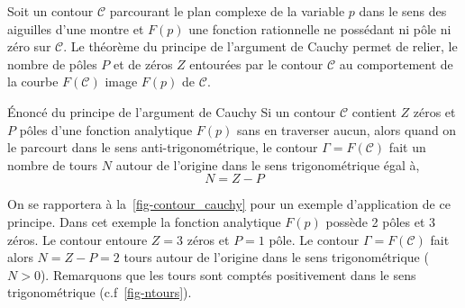 Soit un contour $\mathcal{C}$ parcourant le plan complexe de 
la variable $p$ dans le sens des aiguilles d'une montre et $F(p)$ une fonction 
rationnelle ne possédant ni pôle ni zéro sur $\mathcal{C}$. Le théorème du 
principe de l'argument de Cauchy permet de relier, le nombre de pôles $P$ et 
de zéros $Z$ entourées par le contour $\mathcal{C}$ au comportement de la 
courbe $F(\mathcal{C})$ image $F(p)$ de $\mathcal{C}$.

\begin{theorem}{\'Enoncé du principe de l'argument de Cauchy} 
    Si un contour $\mathcal{C}$ contient $Z$ zéros et $P$ pôles d'une fonction 
    analytique $F(p)$ sans en traverser aucun, alors quand on le parcourt dans 
    le sens anti-trigonométrique, le contour $\Gamma=F(\mathcal{C})$ fait un 
    nombre de tours $N$ autour de l'origine dans le sens trigonométrique égal 
    à,
    $$
    N=Z-P
    $$
\end{theorem}

On se rapportera à la~\cref{fig-contour_cauchy} pour un exemple d'application 
de ce principe. Dans cet exemple la fonction analytique $F(p)$ possède 2 pôles 
et 3 zéros. Le contour entoure $Z=3$ zéros et $P=1$ pôle.
Le contour $\Gamma=F(\mathcal{C})$ fait alors $N=Z-P=2$ tours autour 
de l'origine dans le sens trigonométrique ($N>0$). Remarquons que les tours 
sont comptés positivement dans le sens trigonométrique (c.f~\cref{fig-ntours}).

